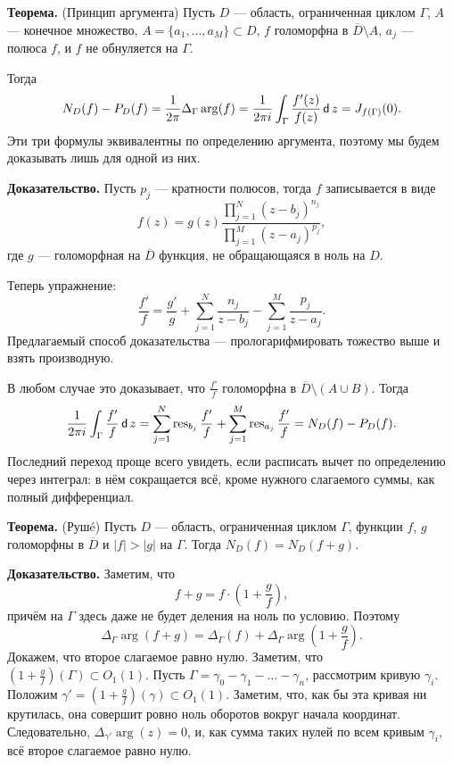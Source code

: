 \textbf{Теорема.} (Принцип аргумента)
Пусть $D$ --- область, ограниченная циклом $\Gamma$, $A$ --- конечное множество, $A = \{a_1, \dots, a_M\} \subset D$, $f$ голоморфна в $\overline D \setminus A$, $a_j$ --- полюса $f$, и $f$ не обнуляется на $\Gamma$.

Тогда 
\[
    N_D(f) - P_D(f) = \frac{1}{2\pi} \Delta_\Gamma \arg(f) = \frac{1}{2\pi i} \int_\Gamma \frac{f'(z)}{f(z)} \operatorname{\mathsf d} z = J_{f(\Gamma)}(0).
\]
Эти три формулы эквивалентны по определению аргумента, поэтому мы будем доказывать лишь для одной из них.

\textbf{Доказательство.} Пусть $p_j$ --- кратности полюсов, тогда $f$ записывается в виде
\[
    f(z) = g(z) \frac{\prod_{j=1}^N (z - b_j)^{n_j}}{\prod_{j=1}^M (z - a_j)^{p_j}},
\]
где $g$ --- голоморфная на $\overline D$ функция, не обращающаяся в ноль на $D$.

Теперь упражнение:
\[
    \frac{f'}{f} = \frac{g'}{g} + \sum_{j=1}^{N} \frac{n_j}{z - b_j} - \sum_{j=1}^{M} \frac{p_j}{z - a_j}.
\]
Предлагаемый способ доказательства --- прологарифмировать тожество выше и взять производную.

В любом случае это доказывает, что $\frac{f'}{f}$ голоморфна в $\overline D \setminus (A \cup B)$.
Тогда
\[
    \frac{1}{2\pi i} \int_\Gamma \frac{f'}{f} \operatorname{\mathsf d} z = \sum_{j=1}^{N} \operatorname{res}_{b_j} \frac{f'}{f} + \sum_{j=1}^{M} \operatorname{res}_{a_j} \frac{f'}{f}  = N_D(f) - P_D(f).
\]
Последний переход проще всего увидеть, если расписать вычет по определению через интеграл: в нём сокращается всё, кроме нужного слагаемого суммы, как полный дифференциал.

\QED

\textbf{Теорема.} (Рушé) Пусть $D$ --- область, ограниченная циклом $\Gamma$, функции $f$, $g$ голоморфны в $\overline D$ и $|f| > |g|$ на $\Gamma$.
Тогда $N_D(f) = N_D(f + g)$.

\textbf{Доказательство.} Заметим, что
\[
    f + g = f \cdot \left( 1 + \frac{g}{f} \right),
\]
причём на $\Gamma$ здесь даже не будет деления на ноль по условию.
Поэтому
\[
    \Delta_\Gamma \arg(f + g) = \Delta_\Gamma(f) + \Delta_\Gamma \arg \left(1 + \frac{g}{f} \right).
\]
Докажем, что второе слагаемое равно нулю.
Заметим, что $(1 + \frac{g}{f})(\Gamma) \subset O_1(1)$.
Пусть $\Gamma = \gamma_0 - \gamma_1 - \dots - \gamma_n$, рассмотрим кривую $\gamma_i$.
Положим $\gamma' = (1 + \frac{g}{f})(\gamma) \subset O_1(1)$.
Заметим, что, как бы эта кривая ни крутилась, она совершит ровно ноль оборотов вокруг начала координат.
Следовательно, $\Delta_{\gamma'} \arg(z) = 0$, и, как сумма таких нулей по всем кривым $\gamma_i$, всё второе слагаемое равно нулю.

